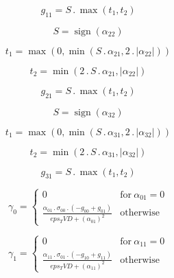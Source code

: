 \documentclass{article}
\begin{document}
\begin{dmath}g_{11} = S \,.\, \max\left(t_{1}, t_{2}\right)\end{dmath}

\begin{dmath}S = \operatorname{sign}{\left (\alpha_{22} \right )}\end{dmath}

\begin{dmath}t_{1} = \max\left(0, \min\left(S \,.\, \alpha_{21}, 2 \,.\, \left|{\alpha_{22}}\right|\right)\right)\end{dmath}

\begin{dmath}t_{2} = \min\left(2 \,.\, S \,.\, \alpha_{21}, \left|{\alpha_{22}}\right|\right)\end{dmath}

\begin{dmath}g_{21} = S \,.\, \max\left(t_{1}, t_{2}\right)\end{dmath}

\begin{dmath}S = \operatorname{sign}{\left (\alpha_{32} \right )}\end{dmath}

\begin{dmath}t_{1} = \max\left(0, \min\left(S \,.\, \alpha_{31}, 2 \,.\, \left|{\alpha_{32}}\right|\right)\right)\end{dmath}

\begin{dmath}t_{2} = \min\left(2 \,.\, S \,.\, \alpha_{31}, \left|{\alpha_{32}}\right|\right)\end{dmath}

\begin{dmath}g_{31} = S \,.\, \max\left(t_{1}, t_{2}\right)\end{dmath}

\begin{dmath}\gamma_{0} = \begin{cases} 0 & \text{for}\: \alpha_{01} = 0 \\\frac{\alpha_{01} \,.\, \sigma_{0 0} \,.\, \left(- g_{00} + g_{01}\right)}{eps_TVD + \left(\alpha_{01} \right)^{2}} & \text{otherwise} \end{cases}\end{dmath}

\begin{dmath}\gamma_{1} = \begin{cases} 0 & \text{for}\: \alpha_{11} = 0 \\\frac{\alpha_{11} \,.\, \sigma_{0 1} \,.\, \left(- g_{10} + g_{11}\right)}{eps_TVD + \left(\alpha_{11} \right)^{2}} & \text{otherwise} \end{cases}\end{dmath}
\end{document}

